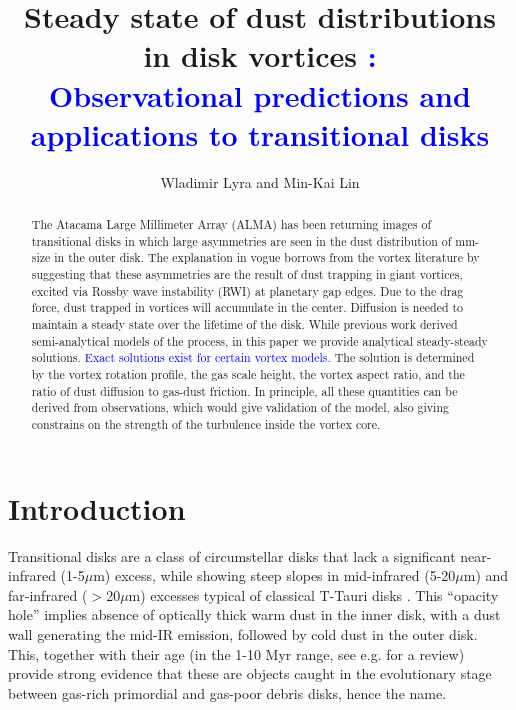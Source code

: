 \documentclass[apj]{emulateapj}
\def\blue#1{\textcolor{blue}{ #1}}
\begin{document}
\title{Steady state of dust distributions in disk vortices{\blue:}\\
\blue{Observational predictions and applications to transitional disks}}
\author{Wladimir Lyra and Min-Kai Lin}

\begin{abstract}
The Atacama Large Millimeter Array (ALMA) has been  returning images of transitional disks in which large asymmetries are seen in the dust distribution of 
mm-size in the outer disk. The explanation in vogue borrows from the vortex literature by suggesting 
that these asymmetries are the result of dust trapping in giant vortices, excited via Rossby wave instability (RWI) 
at planetary gap edges. Due to the drag force, dust trapped in vortices will accumulate 
in the center. Diffusion is needed to maintain a steady state over the lifetime of the disk. While previous work 
derived semi-analytical models of the process, in this paper we
provide analytical steady-steady solutions. \blue{Exact solutions exist for certain vortex models.}
The solution is determined by the vortex rotation profile, the gas scale height, the 
vortex aspect ratio, and the ratio of dust diffusion to gas-dust friction. In principle, all these quantities can be derived
from observations, which would give validation of the model, also giving constrains on the strength of the turbulence 
inside the vortex core.
\end{abstract}

\section{Introduction}
\label{sect:introduction}

Transitional disks are a class of circumstellar disks that lack a
significant near-infrared (1-5$\mu$m) excess, while showing steep
slopes in mid-infrared (5-20$\mu$m) and
far-infrared ($>$20$\mu$m) excesses typical of classical T-Tauri disks
\citep{Strom89,Skrutskie90,Gauvin-Strom92,Wolk-Walter96,Calvet02,Calvet05,Muzerolle06,Sicilia06,Currie09,Currie-Sicilia11}. 
This ``opacity hole''  implies absence of optically thick warm dust in the inner disk, with a dust
wall generating the mid-IR emission, followed by cold dust in the
outer disk.  This, together with their age (in the 1-10 Myr range, see
e.g. \citealt{Currie10} for a review) provide strong evidence that these are
objects caught in the evolutionary stage between gas-rich 
primordial and gas-poor debris disks, hence the name. 
\end{document}
